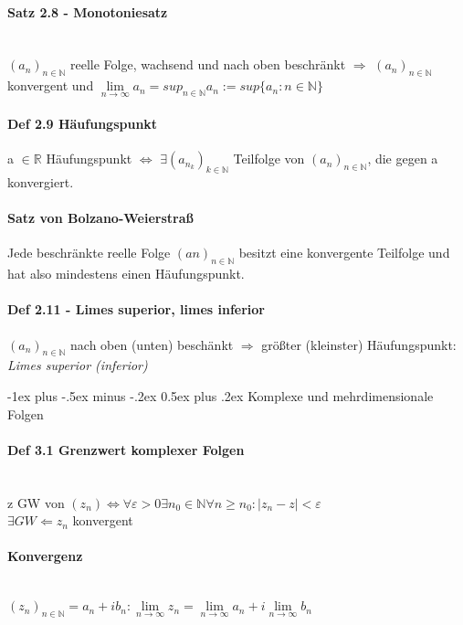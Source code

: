 \documentclass[paper=a3,paper=landscape, fontsize=9pt,DIV=25]{scrartcl}
\makeatletter
\newcommand{\real}{{\mathbb{R}}}
\newcommand{\nat}{\mathbb{N}}
\newcommand{\aseq}{(a_n)_{n \in \nat}}
\renewcommand{\section}{\@startsection{section}{1}{0mm}%
  {-1ex plus -.5ex minus -.2ex}%
  {0.5ex plus .2ex}%
  {\color{blue}\normalfont\large\bfseries}}
\makeatother
\begin{document}
\begin{multicols*}{4}
  \paragraph{Satz 2.8 - Monotoniesatz}\hspace{0pt} \\
  $\aseq$ reelle Folge, wachsend und nach oben beschränkt $\Rightarrow$ $\aseq$ konvergent und $\lim\limits_{n \rightarrow \infty} a_n = sup_{n \in \nat} a_n := sup \{a_n : n \in \nat\}$


  \paragraph{Def 2.9 Häufungspunkt}
  a $\in \real$ Häufungspunkt $\Leftrightarrow$ $ \exists (a_{n_k})_{k \in \nat}$ Teilfolge von $\aseq$, die gegen a konvergiert.


  \paragraph{Satz von Bolzano-Weierstraß}
  Jede beschränkte reelle Folge $(an)_{n \in \nat}$ besitzt eine konvergente Teilfolge und hat also mindestens einen Häufungspunkt.


  \paragraph{Def 2.11 - Limes superior, limes inferior}
  $\aseq$ nach oben (unten) beschänkt $\Rightarrow$ größter (kleinster) Häufungspunkt: \emph{Limes superior (inferior)}



  \section{Komplexe und mehrdimensionale Folgen}

  \paragraph{Def 3.1 Grenzwert komplexer Folgen}\hspace{0pt} \\
  z GW von $(z_n) \Leftrightarrow \forall \varepsilon > 0 \exists n_0 \in \nat \forall n \geq n_0 : |z_n - z| < \varepsilon$\\
  $\exists GW \Leftarrow z_n$ konvergent


  \paragraph{Konvergenz}\hspace{0pt} \\
  $(z_n)_{n \in \nat} = a_n + ib_n: \lim\limits_{n\rightarrow \infty} z_n = \lim\limits_{n\rightarrow \infty} a_n + i \lim\limits_{n\rightarrow \infty} b_n$



\end{multicols*}
\end{document}
